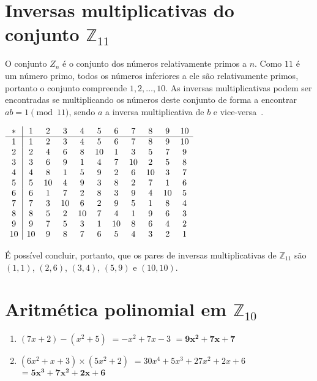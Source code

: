 \documentclass[12pt]{article}
\begin{document}
\section{Inversas multiplicativas do conjunto $\mathbb{Z}_{11}$}

O conjunto $Z_{n}$ é o conjunto dos números relativamente primos a $n$. Como
$11$ é um número primo, todos os números inferiores a ele são relativamente
primos, portanto o conjunto compreende ${1, 2, \ldots, 10}$. As inversas
multiplicativas podem ser encontradas se multiplicando os números deste
conjunto de forma a encontrar $ab = 1 \pmod{11}$, sendo $a$ a inversa
multiplicativa de $b$ e vice-versa~\cite{stallings:2002}.

\begin{center}
    $\begin{array}{ c | c c c c c c c c c c }
        *  & 1 & 2 & 3 & 4 & 5 & 6 & 7 & 8 & 9 & 10 \\ \hline
        1  & 1 & 2 & 3 & 4 & 5 & 6 & 7 & 8 & 9 & 10 \\
        2  & 2 & 4 & 6 & 8 & 10 & 1 & 3 & 5 & 7 & 9 \\
        3  & 3 & 6 & 9 & 1 & 4 & 7 & 10 & 2 & 5 & 8 \\
        4  & 4 & 8 & 1 & 5 & 9 & 2 & 6 & 10 & 3 & 7 \\
        5  & 5 & 10 & 4 & 9 & 3 & 8 & 2 & 7 & 1 & 6 \\
        6  & 6 & 1 & 7 & 2 & 8 & 3 & 9 & 4 & 10 & 5 \\
        7  & 7 & 3 & 10 & 6 & 2 & 9 & 5 & 1 & 8 & 4 \\
        8  & 8 & 5 & 2 & 10 & 7 & 4 & 1 & 9 & 6 & 3 \\
        9  & 9 & 7 & 5 & 3 & 1 & 10 & 8 & 6 & 4 & 2 \\
        10 & 10 & 9 & 8 & 7 & 6 & 5 & 4 & 3 & 2 & 1 \\
    \end{array}$
\end{center}

É possível concluir, portanto, que os pares de inversas multiplicativas de
$\mathbb{Z}_{11}$ são $(1, 1)$, $(2, 6)$, $(3, 4)$, $(5, 9)$ e $(10, 10)$.

\section{Aritmética polinomial em $\mathbb{Z}_{10}$}

\begin{enumerate}[label=\textbf{\alph*})]
    \setlength\itemsep{1em}

    \item $(7x+2)-(x^{2}+5)$
        $= -x^{2}+7x-3$
        $= \boldsymbol{9x^{2}+7x+7}$

    \item $(6x^{2}+x+3) \times (5x^{2}+2)$
        $= 30x^{4}+5x^{3}+27x^{2}+2x+6$
        $= \boldsymbol{5x^{3}+7x^{2}+2x+6}$
\end{enumerate}
\end{document}
